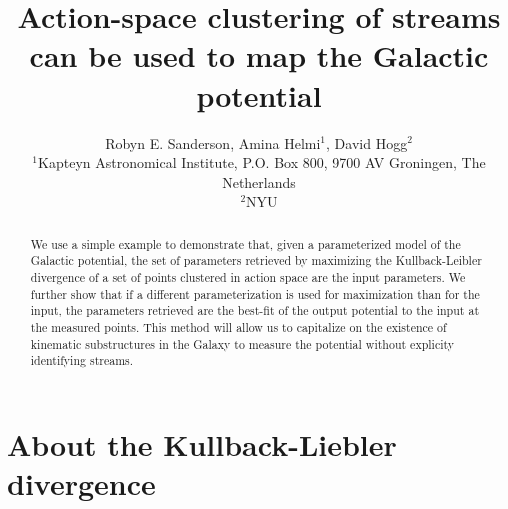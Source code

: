 \documentclass[useAMS,usenatbib,a4paper,referee]{mn2e}
\begin{document}
\title{Action-space clustering of streams can be used to map the Galactic potential}
\author[]{Robyn E. Sanderson, Amina Helmi${}^{1}$, David Hogg${}^{2}$\\
${}^{1}$Kapteyn Astronomical Institute, P.O. Box 800, 9700 AV Groningen, The Netherlands\\
${}^{2}$NYU}

\maketitle

\begin{abstract}
We use a simple example to demonstrate that, given a parameterized model of the Galactic potential, the set of parameters retrieved by maximizing the Kullback-Leibler divergence of a set of points clustered in action space are the input parameters. We further show that if a different parameterization is used for maximization than for the input, the parameters retrieved are the best-fit of the output potential to the input at the measured points. This method will allow us to capitalize on the existence of kinematic substructures in the Galaxy to measure the potential without explicity identifying streams.
\end{abstract}


\section{About the Kullback-Liebler divergence}
\label{sec:kld}
\end{document}
